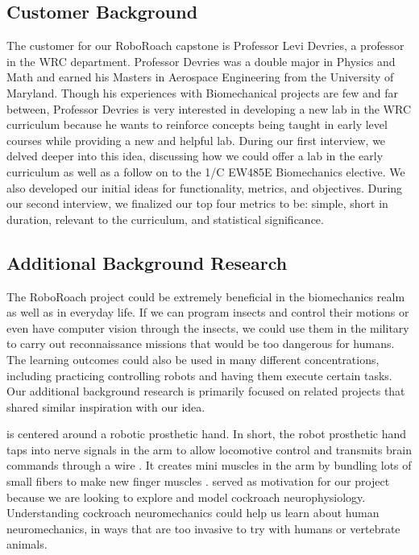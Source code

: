 \documentclass{article}
\begin{document}
\subsection{Customer Background}
\par The customer for our RoboRoach capstone is Professor Levi Devries, a professor in the WRC department. Professor Devries was a double major in Physics and Math and earned his Masters in Aerospace Engineering from the University of Maryland. Though his experiences with Biomechanical projects are few and far between, Professor Devries is very interested in developing a new lab in the WRC curriculum because he wants to reinforce concepts being taught in early level courses while providing a new and helpful lab. During our first interview, we delved deeper into this idea, discussing how we could offer a lab in the early curriculum as well as a follow on to the 1/C EW485E Biomechanics elective. We also developed our initial ideas for functionality, metrics, and objectives. During our second interview, we finalized our top four metrics to be: simple, short in duration, relevant to the curriculum, and statistical significance. 

\subsection{Additional Background Research}

\par The RoboRoach project could be extremely beneficial in the biomechanics realm as well as in everyday life. If we can program insects and control their motions or even have computer vision through the insects, we could use them in the military to carry out reconnaissance missions that would be too dangerous for humans. The learning outcomes could also be used in many different concentrations, including practicing controlling robots and having them execute certain tasks. Our additional background research is primarily focused on related projects that shared similar inspiration with our idea. 

\bigskip

\cite{servick2020minimuscles} is centered around a robotic prosthetic hand. 
In short, the robot prosthetic hand taps into nerve signals in the arm to allow locomotive control and transmits brain commands through a wire \cite{servick2020minimuscles}. It creates mini muscles in the arm by bundling lots of small fibers to make new finger muscles \cite{servick2020minimuscles}. \cite{servick2020minimuscles} served as motivation for our project because we are looking to explore and model cockroach neurophysiology. Understanding cockroach neuromechanics could help us learn about human neuromechanics, in ways that are too invasive to try with humans or vertebrate animals. 
\end{document}
